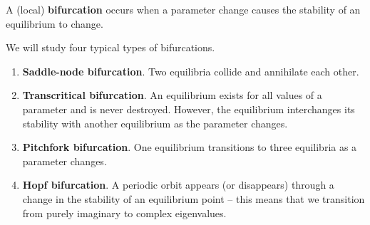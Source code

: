 \begin{SaveDefinition}[key=bifurcations, title={Bifurcations}]

A (local) \textbf{bifurcation} occurs when a parameter change causes the stability of an equilibrium to change.

We will study four typical types of bifurcations.

\begin{enumerate}
	\item \textbf{Saddle-node bifurcation}. Two equilibria collide and annihilate each other.
	\item \textbf{Transcritical bifurcation}. An equilibrium exists for all values of a parameter and is never destroyed. However, the equilibrium interchanges its stability with another equilibrium as the parameter changes.
	\item \textbf{Pitchfork bifurcation}. One equilibrium transitions to three equilibria as a parameter changes.
	\item \textbf{Hopf bifurcation}. A periodic orbit appears (or disappears) through a change in the stability of an equilibrium point -- this means that we transition from purely imaginary to complex eigenvalues.
\end{enumerate}


\end{SaveDefinition}




